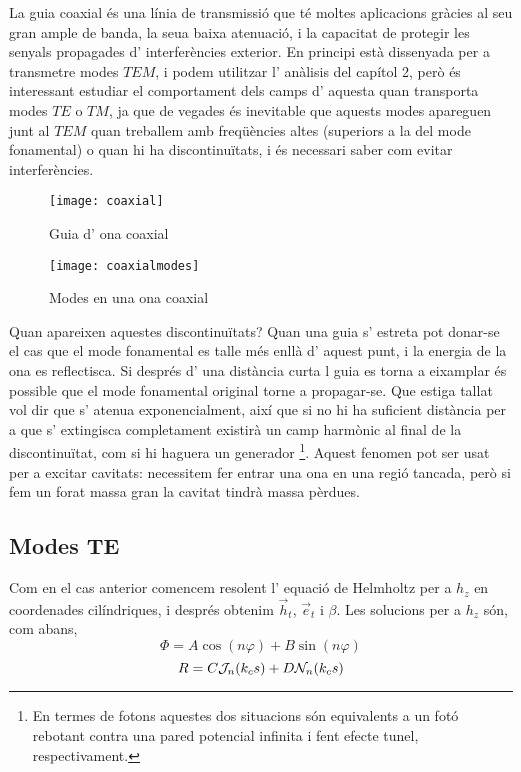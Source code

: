La guia coaxial és una línia de transmissió que té moltes aplicacions gràcies al seu gran ample de banda, la seua baixa atenuació, i la capacitat de protegir les senyals propagades d' interferències exterior. En principi està dissenyada per a transmetre modes $TEM$, i podem utilitzar l' anàlisis del capítol 2, però és interessant estudiar el comportament dels camps d' aquesta quan transporta modes $TE$ o $TM$, ja que de vegades és inevitable que aquests modes apareguen junt al $TEM$ quan treballem amb freqüències altes (superiors a la del mode fonamental) o quan hi ha discontinuïtats, i és necessari saber com evitar interferències.

\begin{figure}[ht]
  \centering
  \begin{minipage}{7cm}
    \centering
    \texttt{[image: coaxial]}
    \caption{Guia d' ona coaxial}
    \label{coaxial}
  \end{minipage}
  \begin{minipage}{7cm}
    \centering
    \texttt{[image: coaxialmodes]}
    \caption{Modes en una ona coaxial}
  \end{minipage}
\end{figure}

Quan apareixen aquestes discontinuïtats? Quan una guia s' estreta pot donar-se el cas que el mode fonamental es talle més enllà d' aquest punt, i la energia de la ona es reflectisca. Si després d' una distància curta l guia es torna a eixamplar és possible que el mode fonamental original torne a propagar-se. Que estiga tallat vol dir que s' atenua exponencialment, així que si no hi ha suficient distància per a que s' extingisca completament existirà un camp harmònic al final de la discontinuïtat, com si hi haguera un generador \footnote{En termes de fotons aquestes dos situacions són equivalents a un fotó rebotant contra una pared potencial infinita i fent efecte tunel, respectivament.}. Aquest fenomen pot ser usat per a excitar cavitats: necessitem fer entrar una ona en una regió tancada, però si fem un forat massa gran la cavitat tindrà massa pèrdues.

\subsection{Modes TE}

Com en el cas anterior comencem resolent l' equació de Helmholtz per a $h_z$ en coordenades cilíndriques, i després obtenim $\vec h_t$, $\vec e_t$ i $\beta$. Les solucions per a $h_z$ són, com abans,
\begin{equation}
  \Phi = A \cos ( n \varphi) + B \sin (n \varphi)
\end{equation}
\begin{equation}
  R = C \mathcal J_n ( k_c s ) + D \mathcal N_n (k_c s)
\end{equation}


